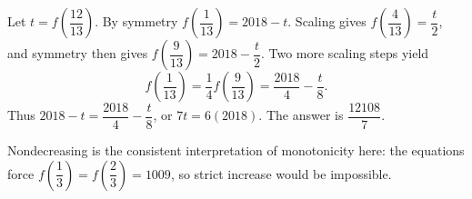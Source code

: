Let $t=f(\dfrac{12}{13})$. By symmetry $f(\dfrac{1}{13})=2018-t$. Scaling gives $f(\dfrac{4}{13})=\dfrac{t}{2}$, and symmetry then gives $f(\dfrac{9}{13})=2018-\dfrac{t}{2}$. Two more scaling steps yield
\[f\left(\dfrac{1}{13}\right)=\dfrac{1}{4} f\left(\dfrac{9}{13}\right)=\dfrac{2018}{4}-\dfrac{t}{8}.\]
Thus $2018-t=\dfrac{2018}{4}-\dfrac{t}{8}$, or $7t=6(2018)$. The answer is $\boxed{\dfrac{12108}{7}}$.

Nondecreasing is the consistent interpretation of monotonicity here: the equations force $f(\dfrac{1}{3})=f(\dfrac{2}{3})=1009$, so strict increase would be impossible.
